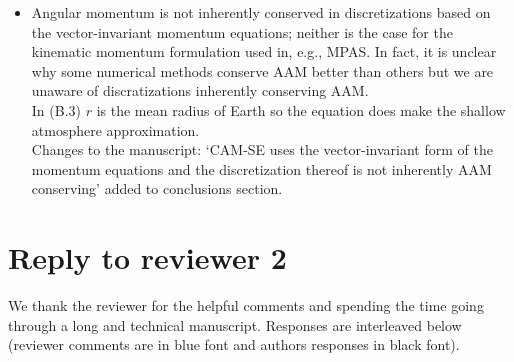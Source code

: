 \documentclass[11pt]{article}
\begin{document}
\begin{itemize}
\item {\color{blue}{Appendix B: we see that the continuous equations are indeed mass, angular momentum, and energy conserving. How might the discretization affect these conservation relations? In particular, I had thought that the vector-invariant momentum equation (49) is not angular-momentum conserving; and the angular momentum conservation law (B.3) does not make the shallow-atmosphere approxmiation used in the rest of the text.}}

Angular momentum is not inherently conserved in discretizations based on the vector-invariant momentum equations; neither is the case for the kinematic momentum formulation used in, e.g., MPAS. In fact, it is unclear why some numerical methods conserve AAM better than others \citep[see ][]{LBDL2014JAMES} but we are unaware of discratizations inherently conserving AAM.\\

In (B.3) $r$ is the mean radius of Earth so the equation does make the shallow atmosphere approximation.\\

Changes to the manuscript: `CAM-SE uses the vector-invariant form of the momentum equations and the discretization thereof is not inherently AAM conserving' added to conclusions section.
\end{itemize}  
\newpage

\section{Reply to reviewer 2}
We thank the reviewer for the helpful comments and spending the time going through a long and technical manuscript. Responses are interleaved below (reviewer comments are in blue font and authors responses in black font). 
\end{document}
